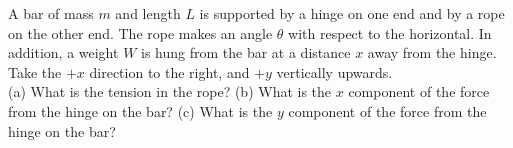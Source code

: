 A bar of mass $m$ and length $L$ is supported by a hinge on one end
and by a rope on the other end. The rope makes an angle $\theta$ with
respect to the horizontal. In addition, a weight $W$ is hung from the bar at a
distance $x$ away from the hinge. Take the $+x$ direction to the
right, and $+y$ vertically upwards.\\
%
(a) What is the tension in the rope?\answercheck\hwendpart
%
(b) What is the $x$ component of the force from the hinge on the
bar?\answercheck\hwendpart
%
(c) What is the $y$ component of the force from the hinge on the bar?\answercheck
